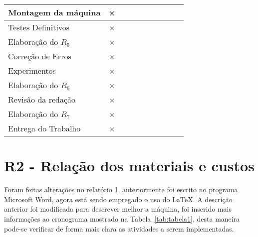\documentclass[journal]{IEEEtran}
\begin{document}
\begin{table}[!htbp]
{\begin{center}
\begin{tabularx}{\columnwidth}{|L|c|cccccccc}
Montagem da máquina & × &  &  &  &  &  &  &  & \\\hline
Testes Definitivos & × &  &  &  &  &  &  &  & \\\hline
Elaboração do $R_5$ & × &  &  &  &  &  &  &  & \\\hline
Correção de Erros & × &  &  &  &  &  &  &  & \\\hline
Experimentos & × &  &  &  &  &  &  &  & \\\hline
Elaboração do $R_6$ & × &  &  &  &  &  &  &  & \\\hline
Revisão da redação & × &  &  &  &  &  &  &  & \\\hline
Elaboração do $R_7$ & × &  &  &  &  &  &  &  & \\\hline
Entrega do Trabalho & × &  &  &  &  &  &  &  & \\\hline
\end{tabularx}
\end{center}
}%
\end{table}




\section{R2 - Relação dos materiais e custos}
Foram feitas alterações no relatório 1, anteriormente foi escrito no programa Microsoft Word, agora está sendo empregado o uso do \LaTeX. A descrição anterior foi modificada para descrever melhor a máquina, foi inserido mais informações ao cronograma mostrado na Tabela~\ref{tab:tabela1}, desta maneira pode-se verificar de forma mais clara as atividades a serem implementadas.
\end{document}
